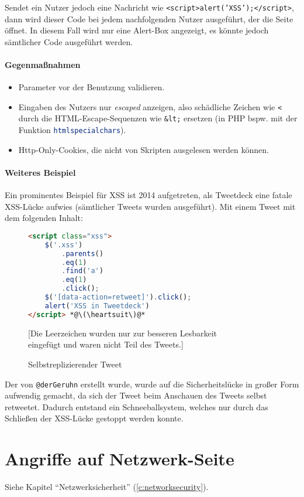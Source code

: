 					Sendet ein Nutzer jedoch eine Nachricht wie \texttt{<script>alert('XSS');</script>}, dann wird dieser Code bei jedem nachfolgenden Nutzer ausgeführt, der die Seite öffnet. In diesem Fall wird nur eine Alert-Box angezeigt, es könnte jedoch sämtlicher Code ausgeführt werden.

				\paragraph{Gegenmaßnahmen}
					\begin{itemize}
						\item Parameter vor der Benutzung validieren.
						\item Eingaben des Nutzers nur \textit{escaped} anzeigen, also schädliche Zeichen wie \texttt{<} durch die HTML-Escape-Sequenzen wie \texttt{\&lt;} ersetzen (in PHP bspw. mit der Funktion \lstinline[language = PHP]|htmlspecialchars|).
						\item Http-Only-Cookies, die nicht von Skripten ausgelesen werden können.
					\end{itemize}

				\paragraph{Weiteres Beispiel}
					Ein prominentes Beispiel für XSS ist 2014 aufgetreten, als Tweetdeck eine fatale XSS-Lücke aufwies (sämtlicher Tweets wurden ausgeführt). Mit einem Tweet mit dem folgenden Inhalt:
					\begin{figure}[H]
						\centering
						\begin{lstlisting}[language = HTML]
<script class="xss">
	$('.xss')
		.parents()
		.eq(1)
		.find('a')
		.eq(1)
		.click();
	$('[data-action=retweet]').click();
	alert('XSS in Tweetdeck')
</script> *@\(\heartsuit\)@*
\end{lstlisting}
						[Die Leerzeichen wurden nur zur besseren Lesbarkeit \\ eingefügt und waren nicht Teil des Tweets.]
						\caption{Selbstreplizierender Tweet}
					\end{figure}
					Der von \texttt{@derGeruhn} erstellt wurde, wurde auf die Sicherheitslücke in großer Form aufwendig gemacht, da sich der Tweet beim Anschauen des Tweets selbst retweetet. Dadurch entstand ein Schneeballsystem, welches nur durch das Schließen der XSS-Lücke gestoppt werden konnte.

	\section{Angriffe auf Netzwerk-Seite}
		Siehe Kapitel \enquote{Netzwerksicherheit} (\ref{c:networksecurity}).

